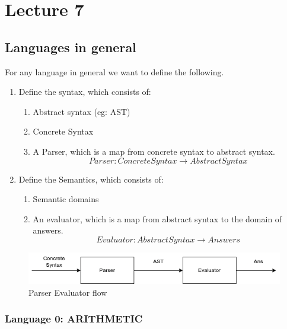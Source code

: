 \chapter{Lecture 7}
    
    \section{Languages in general}
    
    For any language in general we want to define the following.
    \begin{enumerate}
        \item Define the syntax, which consists of:
            \begin{enumerate}
                \item Abstract syntax (eg: AST)
                \item Concrete Syntax
                \item A Parser, which is a map from concrete syntax to abstract syntax.
                $$
                Parser : Concrete Syntax \rightarrow Abstract Syntax
                $$
            \end{enumerate}
        \item Define the Semantics, which consists of:
            \begin{enumerate}
                \item Semantic domains
                \item An evaluator, which is a map from abstract syntax to the domain of answers.
                $$
                Evaluator : Abstract Syntax \rightarrow Answers 
                $$
            \end{enumerate}
    \end{enumerate}
    
    \begin{figure}[htbp]
        \center
        \includegraphics[scale=0.6]{images/lecture11/parser-evaluator.png}
        \caption{Parser Evaluator flow}
    \end{figure}
    
    \subsection{Language 0: ARITHMETIC}
    
